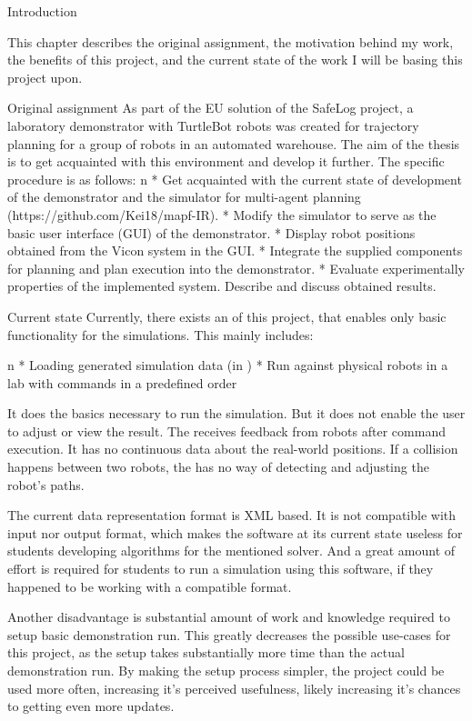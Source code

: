 \chap Introduction

This chapter describes the original assignment, the motivation behind my work, the benefits of this project, and the current state of the work I will be basing this project upon.

\sec Original assignment
As part of the EU solution of the SafeLog project, a laboratory demonstrator with TurtleBot robots was created for trajectory planning for a group of robots in an automated warehouse. The aim of the thesis is to get acquainted with this environment and develop it further. The specific procedure is as follows:
\begitems \style n
    * Get acquainted with the current state of development of the demonstrator and the simulator for multi-agent planning (https://github.com/Kei18/mapf-IR).
    * Modify the simulator to serve as the basic user interface (GUI) of the demonstrator.
    * Display robot positions obtained from the Vicon system in the GUI.
    * Integrate the supplied components for planning and plan execution into the demonstrator.
    * Evaluate experimentally properties of the implemented system. Describe and discuss obtained results.
\enditems

\sec Current state
Currently, there exists an {\oldRepo} of this project, that enables only basic functionality for the simulations. This mainly includes:

\begitems \style n
    * Loading generated simulation data (in {\oldFormat})
    * Run against physical robots in a lab with commands in a predefined order
\enditems

It does the basics necessary to run the simulation. But it does not enable the user to adjust or view the result. The {\oldRepo} receives feedback from robots after command execution. It has no continuous data about the real-world positions. If a collision happens between two robots, the {\oldRepo} has no way of detecting and adjusting the robot's paths.

The current data representation format is XML based. It is not compatible with {\mapfIR} input nor output format, which makes the software at its current state useless for students developing algorithms for the \mapfIR mentioned solver. And a great amount of effort is required for students to run a simulation using this software, if they happened to be working with a compatible format.

Another disadvantage is substantial amount of work and knowledge required to setup basic demonstration run. This greatly decreases the possible use-cases for this project, as the setup takes substantially more time than the actual demonstration run. By making the setup process simpler, the project could be used more often, increasing it's perceived usefulness, likely increasing it's chances to getting even more updates.

